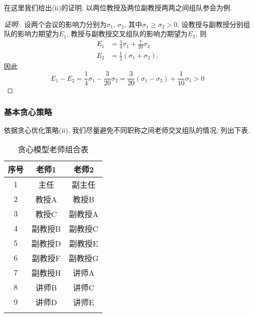         在这里我们给出(ii)的证明, 以两位教授及两位副教授两两之间组队参会为例.
        
        \begin{proof}[证明:]
            设两个会议的影响力分别为$\sigma_{1}$, $\sigma_{2}$, 其中$\sigma_{1}\ge \sigma_{2}>0$.
            设教授与副教授分别组队的影响力期望为$E_{1}$,
            教授与副教授交叉组队的影响力期望为$E_{2}$, 则
            \begin{align}
                E_{1}&=\frac{3}{4}\sigma_{1}+\frac{7}{20}\sigma_{2}\\
                E_{2}&=\frac{1}{2}(\sigma_{1}+\sigma_{2}).
            \end{align}
            因此
            \begin{equation}
                E_{1}-E_{2}=\frac{1}{4}\sigma_{1}-\frac{3}{20}\sigma_{2}
                =\frac{3}{20}(\sigma_{1}-\sigma_{2})+\frac{1}{10}\sigma_{1}>0
            \end{equation}
        \end{proof}
    \subsubsection{基本贪心策略}
        依据贪心优化策略(ii), 我们尽量避免不同职称之间老师交叉组队的情况, 列出下表.
        \begin{table}[htb]\footnotesize
            \begin{center}
            \caption{贪心模型老师组合表}
                \begin{tabular}{ccc}
                    \Xhline{1.2pt}
                    序号    &    老师1    &    老师2\\
                    \hline
                    1       &    主任     &    副主任\\
                    2       &    教授A    &    教授B\\
                    3       &    教授C    &    副教授A\\
                    4       &    副教授B  &    副教授C\\
                    5       &    副教授D  &    副教授E\\
                    6       &    副教授F  &    副教授G\\
                    7       &    副教授H  &    讲师A\\
                    8       &    讲师B    &    讲师C\\
                    9       &    讲师D    &    讲师E\\
                    \Xhline{1.2pt}
                \end{tabular}
            \end{center}
        \end{table}
        
